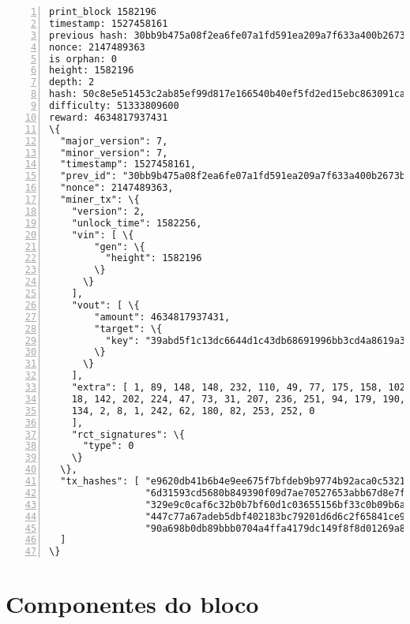 \begin{Verbatim}[commandchars=\\\{\}, numbers=left]
print_block 1582196
timestamp: 1527458161
previous hash: 30bb9b475a08f2ea6fe07a1fd591ea209a7f633a400b2673b8835a975348b0eb
nonce: 2147489363
is orphan: 0
height: 1582196
depth: 2
hash: 50c8e5e51453c2ab85ef99d817e166540b40ef5fd2ed15ebc863091ca2a04594
difficulty: 51333809600
reward: 4634817937431
\{
  "major_version": 7,
  "minor_version": 7,
  "timestamp": 1527458161,
  "prev_id": "30bb9b475a08f2ea6fe07a1fd591ea209a7f633a400b2673b8835a975348b0eb",
  "nonce": 2147489363,
  "miner_tx": \{
    "version": 2,
    "unlock_time": 1582256,
    "vin": [ \{
        "gen": \{
          "height": 1582196
        \}
      \}
    ],
    "vout": [ \{
        "amount": 4634817937431,
        "target": \{
          "key": "39abd5f1c13dc6644d1c43db68691996bb3cd4a8619a37a227667cf2bf055401"
        \}
      \}
    ],
    "extra": [ 1, 89, 148, 148, 232, 110, 49, 77, 175, 158, 102, 45, 72, 201, 193,
    18, 142, 202, 224, 47, 73, 31, 207, 236, 251, 94, 179, 190, 71, 72, 251, 110, 
    134, 2, 8, 1, 242, 62, 180, 82, 253, 252, 0
    ],
    "rct_signatures": \{
      "type": 0
    \}
  \},
  "tx_hashes": [ "e9620db41b6b4e9ee675f7bfdeb9b9774b92aca0c53219247b8f8c7aecf773ae",
                 "6d31593cd5680b849390f09d7ae70527653abb67d8e7fdca9e0154e5712591bf",
                 "329e9c0caf6c32b0b7bf60d1c03655156bf33c0b09b6a39889c2ff9a24e94a54",
                 "447c77a67adeb5dbf402183bc79201d6d6c2f65841ce95cf03621da5a6bffefc",
                 "90a698b0db89bbb0704a4ffa4179dc149f8f8d01269a85f46ccd7f0007167ee4"
  ]
\}
\end{Verbatim}



\section*{Componentes do bloco}

